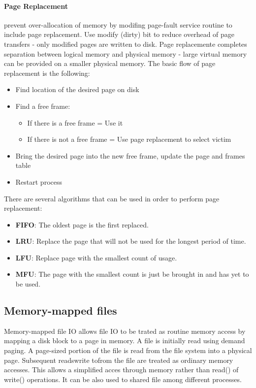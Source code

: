\documentclass[12pt]{article}
\begin{document}
\paragraph{Page Replacement} prevent over-allocation of memory by modifing page-fault service routine to include page replacement. Use modify (dirty) bit to reduce overhead of page transfers - only modified pages are written to disk.
Page replacemente completes separation between logical memory and physical memory - large virtual memory can be provided on a smaller physical memory. The basic flow of page replacement is the following:
\begin{itemize}
  \item Find location of the desired page on disk
  \item Find a free frame:
  \begin{itemize}
    \item If there is a free frame = Use it
    \item If there is not a free frame = Use page replacement to select victim
  \end{itemize}
  \item Bring the desired page into the new free frame, update the page and frames table
  \item Restart process
\end{itemize}
There are several algorithms that can be used in order to perform page replacement:
\begin{itemize}
  \item \textbf{FIFO}: The oldest page is the first replaced.
  \item \textbf{LRU}: Replace the page that will not be used for the longest period of time.
  \item \textbf{LFU}: Replace page with the smallest count of usage.
  \item \textbf{MFU}: The page with the smallest count is just be brought in and has yet to be used.
\end{itemize}

\subsection{Memory-mapped files}
Memory-mapped file I\/O allows file I\/O to be trated as routine memory access by mapping a disk block to a page in memory. A file is initially read using demand paging. A page-sized portion of the file is read from the file system into a physical page. Subsequent reads\/write to\/from the file are treated as ordinary memory accesses. This allows a simplified acces through memory rather than read() of write() operations. It can be also used to shared file among different processes.
\end{document}
